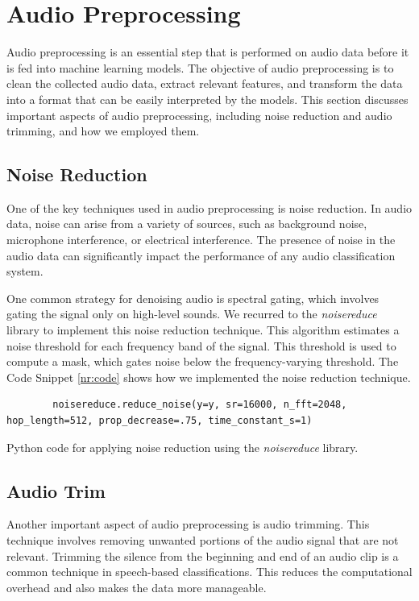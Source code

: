 \section{Audio Preprocessing}


Audio preprocessing is an essential step that is performed on audio data before it is fed into machine learning models. The objective of audio preprocessing is to clean the collected audio data, extract relevant features, and transform the data into a format that can be easily interpreted by the models. This section discusses important aspects of audio preprocessing, including noise reduction and audio trimming, and how we employed them.

\subsection{Noise Reduction}

One of the key techniques used in audio preprocessing is noise reduction. In audio data, noise can arise from a variety of sources, such as background noise, microphone interference, or electrical interference. The presence of noise in the audio data can significantly impact the performance of any audio classification system.

One common strategy for denoising audio is spectral gating, which involves gating the signal only on high-level sounds. We recurred to the \textit{noisereduce} library to implement this noise reduction technique.
This algorithm estimates a noise threshold for each frequency band of the signal. This threshold is used to compute a mask, which gates noise below the frequency-varying threshold. The Code Snippet \ref{nr:code} shows how we implemented the noise reduction technique.

\begin{listing}[H]
	\begin{verbatim}
		noisereduce.reduce_noise(y=y, sr=16000, n_fft=2048, hop_length=512, prop_decrease=.75, time_constant_s=1)
	\end{verbatim}
	\caption{Python code for applying noise reduction using the \textit{noisereduce} library.}
	\label{nr:code}
\end{listing}


\subsection{Audio Trim}

Another important aspect of audio preprocessing is audio trimming. This technique involves removing unwanted portions of the audio signal that are not relevant. Trimming the silence from the beginning and end of an audio clip is a common technique in speech-based classifications. This reduces the computational overhead and also makes the data more manageable.


